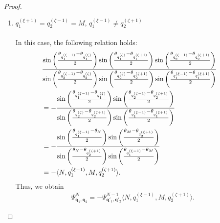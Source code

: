 \documentclass[
amsmath,amssymb,
]{revtex4-2}
\begin{document}
\begin{proof}
\begin{enumerate}
\item[\textit{Case.5:}] ${q_1^{(\xi+1)}} = {q_2^{(\zeta-1)}} = M$, ${q_1^{(\xi-1)}} \ne {q_2^{(\zeta+1)}}$\\ \\
%
In this case, the following relation holds:
\begin{align}
    &\frac{\sin\left( \frac{\theta_{q_1^{(\xi-1)}} - \theta_{q_1^{(\xi)}}}{2} \right)\sin\left( \frac{\theta_{q_1^{(\xi)}} - \theta_{q_1^{(\xi+1)}}}{2} \right)\sin\left( \frac{\theta_{q_2^{(\zeta-1)}} - \theta_{q_2^{(\zeta+1)}}}{2} \right)}
   {\sin\left( \frac{\theta_{q_2^{(\zeta-1)}} - \theta_{q_2^{(\zeta)}}}{2} \right)\sin\left( \frac{\theta_{q_2^{(\zeta)}} - \theta_{q_2^{(\zeta+1)}}}{2} \right)\sin\left( \frac{\theta_{q_1^{(\xi-1)}} - \theta_{q_1^{(\xi+1)}}}{2} \right)}\cr
    &=-\frac{\sin\left( \frac{\theta_{q_1^{(\xi-1)}} - \theta_{q_1^{(\xi)}}}{2} \right)\sin\left( \frac{\theta_{q_2^{(\zeta-1)}} - \theta_{q_2^{(\zeta+1)}}}{2} \right)}
   {\sin\left( \frac{\theta_{q_2^{(\zeta)}} - \theta_{q_2^{(\zeta+1)}}}{2} \right)\sin\left( \frac{\theta_{q_1^{(\xi-1)}} - \theta_{q_1^{(\xi+1)}}}{2} \right)}\cr
    &=-\frac{\sin\left( \frac{\theta_{q_1^{(\xi-1)}} - \theta_{N}}{2} \right)\sin\left( \frac{\theta_{M} - \theta_{q_2^{(\zeta+1)}}}{2} \right)}
   {\sin\left( \frac{\theta_{N} - \theta_{q_2^{(\zeta+1)}}}{2} \right)\sin\left( \frac{\theta_{q_1^{(\xi-1)}} - \theta_{M}}{2} \right)}\cr
    &= -\langle N,q_1^{(\xi-1)},M, q_2^{(\zeta+1)}\rangle.
\end{align}
Thus, we obtain
\begin{align}
    \Psi^N_{\bm{q}_1, \bm{q}_2} = -\Psi^{N-1}_{\bm{q}'_1, \bm{q}'_2}\langle N,q_1^{(\xi-1)},M, q_2^{(\zeta+1)}\rangle.
\end{align}


\end{enumerate}
\end{proof}
\end{document}
